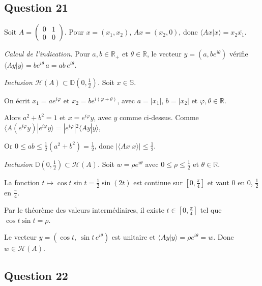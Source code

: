 \documentclass[11pt,a4paper]{article}
\newcommand{\equationajustee}[1]{%
  \sbox{\boiteequation}{$\displaystyle #1$}%
  \ifdim\wd\boiteequation>\linewidth
    \[\resizebox{\linewidth}{!}{\usebox{\boiteequation}}\]%
  \else
    \[#1\]%
  \fi}
\begin{document}
\hypertarget{question-21}{%
\subsection{Question 21}\label{question-21}}

Soit \(A=\begin{pmatrix}0&1\\0&0\end{pmatrix}\). Pour \(x=(x_1,x_2)\), \(Ax=(x_2,0)\), donc \(\langle Ax|x\rangle=x_2\overline{x_1}\).

\emph{Calcul de l'indication.} Pour \(a,b\in\mathbb R_+\) et \(\theta\in\mathbb R\), le vecteur \(y=(a,be^{i\theta})\) vérifie \(\langle Ay|y\rangle=be^{i\theta}\,a=ab\,e^{i\theta}\).

\emph{Inclusion \(\mathcal H(A)\subset\mathbb D(0,\frac12)\).} Soit \(x\in\mathbb S\).

On écrit \(x_1=ae^{i\varphi}\) et \(x_2=be^{i(\varphi+\theta)}\), avec \(a=|x_1|\), \(b=|x_2|\) et \(\varphi,\theta\in\mathbb R\).

Alors \(a^2+b^2=1\) et \(x=e^{i\varphi}y\), avec \(y\) comme ci-dessus. Comme \(\langle A(e^{i\varphi}y)|e^{i\varphi}y\rangle=|e^{i\varphi}|^2\langle Ay|y\rangle\),

\equationajustee{\langle Ax|x\rangle=ab\,e^{i\theta}.}

Or \(0\le ab\le\frac12(a^2+b^2)=\frac12\), donc \(|\langle Ax|x\rangle|\le\frac12\).

\emph{Inclusion \(\mathbb D(0,\frac12)\subset\mathcal H(A)\).} Soit \(w=\rho e^{i\theta}\) avec \(0\le\rho\le\frac12\) et \(\theta\in\mathbb R\).

La fonction \(t\mapsto\cos t\sin t=\frac12\sin(2t)\) est continue sur \([0,\frac\pi4]\) et vaut \(0\) en \(0\), \(\frac12\) en \(\frac\pi4\).

Par le théorème des valeurs intermédiaires, il existe \(t\in[0,\frac\pi4]\) tel que \(\cos t\sin t=\rho\).

Le vecteur \(y=(\cos t,\ \sin t\,e^{i\theta})\) est unitaire et \(\langle Ay|y\rangle=\rho e^{i\theta}=w\). Donc \(w\in\mathcal H(A)\).

\equationajustee{\boxed{\mathcal H\begin{pmatrix}0&1\\0&0\end{pmatrix}=\mathbb D\big(0,\tfrac12\big)}}

\hypertarget{question-22}{%
\subsection{Question 22}\label{question-22}}
\end{document}
